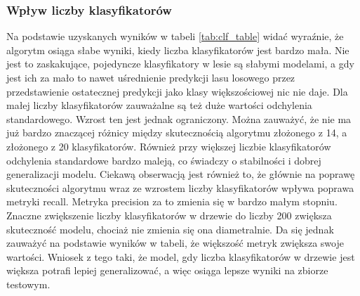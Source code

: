 \documentclass[
    left=2.5cm,         %
    right=2.5cm,        %
    top=2.5cm,          %
    bottom=3cm,         %
    bindingoffset=6mm,  %
    nohyphenation=false %
]{eiti/eiti-report}
\begin{document}
\subsubsection{Wpływ liczby klasyfikatorów}
Na podstawie uzyskanych wyników w tabeli \ref{tab:clf_table} widać wyraźnie, że algorytm osiąga słabe wyniki, kiedy liczba klasyfikatorów jest bardzo mała. Nie jest to zaskakujące, pojedyncze klasyfikatory w lesie są słabymi modelami, a gdy jest ich za mało to nawet uśrednienie predykcji lasu losowego przez przedstawienie ostatecznej predykcji jako klasy większościowej nic nie daje. Dla małej liczby klasyfikatorów zauważalne są też duże wartości odchylenia standardowego. Wzrost ten jest jednak ograniczony. Można zauważyć, że nie ma już bardzo znaczącej różnicy między skutecznością algorytmu złożonego z 14, a złożonego z 20 klasyfikatorów. Również przy większej liczbie klasyfikatorów odchylenia standardowe bardzo maleją, co świadczy o stabilności i dobrej generalizacji modelu. Ciekawą obserwacją jest również to, że głównie na poprawę skuteczności algorytmu wraz ze wzrostem liczby klasyfikatorów wpływa poprawa metryki recall. Metryka precision za to zmienia się w bardzo małym stopniu. Znaczne zwiększenie liczby klasyfikatorów w drzewie do liczby 200 zwiększa skuteczność modelu, chociaż nie zmienia się ona diametralnie. Da się jednak zauważyć na podstawie wyników w tabeli, że większość metryk zwiększa swoje wartości. Wniosek z tego taki, że model, gdy liczba klasyfikatorów w drzewie jest większa potrafi lepiej generalizować, a więc osiąga lepsze wyniki na zbiorze testowym.
\end{document}
